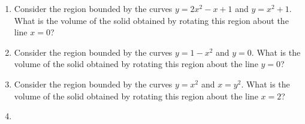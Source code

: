 \begin{enumerate}[ref={\fcProblemRef}]
\item  \label{problemVolumeRegionBoundedByy=2x^2-x+1,y=x^2+1rotatedAroundx=0} Consider the region bounded by the curves $y = 2x^2-x+1$ and $y =x^2+1$. What is the volume of the solid obtained by rotating this region about the line $x = 0$?


\item Consider the region bounded by the curves $y = 1-x^2$ and $y =0$. What is the volume of the solid obtained by
rotating this region about the line $y = 0$?

\item Consider the region bounded by the curves $y = x^2$ and $x = y^2$. What is the volume of the solid obtained by
rotating this region about the line $x = 2$?


\item 


\end{enumerate}
